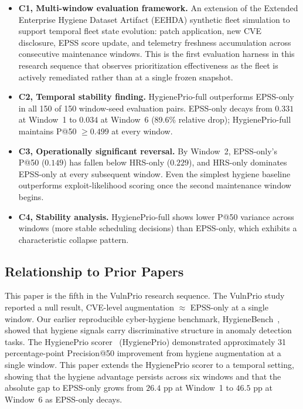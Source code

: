\begin{itemize}
\item \textbf{C1, Multi-window evaluation framework.} An extension of the Extended Enterprise Hygiene Dataset Artifact (EEHDA) synthetic fleet simulation to support temporal fleet state evolution: patch application, new CVE disclosure, EPSS score update, and telemetry freshness accumulation across consecutive maintenance windows. This is the first evaluation harness in this research sequence that observes prioritization effectiveness as the fleet is actively remediated rather than at a single frozen snapshot.

\item \textbf{C2, Temporal stability finding.} HygienePrio-full outperforms EPSS-only in all 150 of 150 window-seed evaluation pairs. EPSS-only decays from $0.331$ at Window~1 to $0.034$ at Window~6 (89.6\% relative drop); HygienePrio-full maintains P@50 $\geq 0.499$ at every window.

\item \textbf{C3, Operationally significant reversal.} By Window~2, EPSS-only's P@50 ($0.149$) has fallen below HRS-only ($0.229$), and HRS-only dominates EPSS-only at every subsequent window. Even the simplest hygiene baseline outperforms exploit-likelihood scoring once the second maintenance window begins.

\item \textbf{C4, Stability analysis.} HygienePrio-full shows lower P@50 variance across windows (more stable scheduling decisions) than EPSS-only, which exhibits a characteristic collapse pattern.
\end{itemize}

\subsection{Relationship to Prior Papers}

This paper is the fifth in the VulnPrio research sequence. The VulnPrio study~\cite{paper1vulnprio} reported a null result, CVE-level augmentation $\approx$ EPSS-only at a single window. Our earlier reproducible cyber-hygiene benchmark, HygieneBench~\cite{paper3hygienebench}, showed that hygiene signals carry discriminative structure in anomaly detection tasks. The HygienePrio scorer~\cite{paper4hygieneprio} (HygienePrio) demonstrated approximately 31 percentage-point Precision@50 improvement from hygiene augmentation at a single window. This paper extends the HygienePrio scorer to a temporal setting, showing that the hygiene advantage persists across six windows and that the absolute gap to EPSS-only grows from $26.4$ pp at Window~1 to $46.5$ pp at Window~6 as EPSS-only decays.
